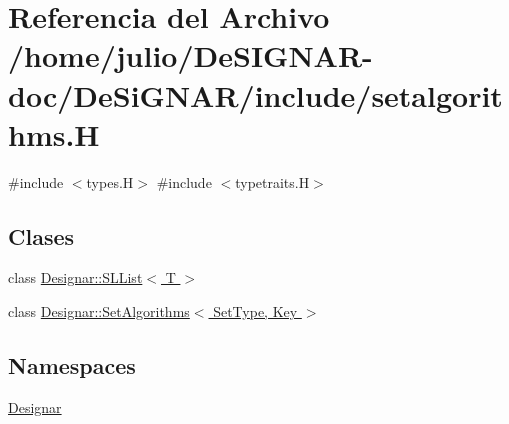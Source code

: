 \hypertarget{setalgorithms_8_h}{}\section{Referencia del Archivo /home/julio/\+De\+S\+I\+G\+N\+A\+R-\/doc/\+De\+Si\+G\+N\+A\+R/include/setalgorithms.H}
\label{setalgorithms_8_h}
{\ttfamily \#include $<$types.\+H$>$}\newline
{\ttfamily \#include $<$typetraits.\+H$>$}\newline
\subsection*{Clases}
\begin{DoxyCompactItemize}
\item 
class \hyperlink{class_designar_1_1_s_l_list}{Designar\+::\+S\+L\+List$<$ T $>$}
\item 
class \hyperlink{class_designar_1_1_set_algorithms}{Designar\+::\+Set\+Algorithms$<$ Set\+Type, Key $>$}
\end{DoxyCompactItemize}
\subsection*{Namespaces}
\begin{DoxyCompactItemize}
\item 
 \hyperlink{namespace_designar}{Designar}
\end{DoxyCompactItemize}
